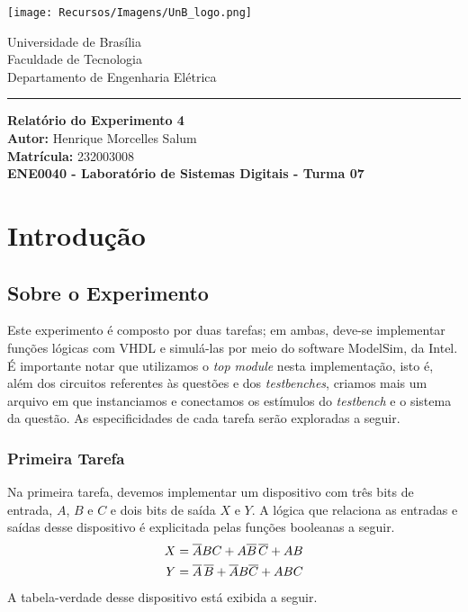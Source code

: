 \documentclass[a4paper,12pt]{article}
\newcommand{\capa}{
    \begin{titlepage}
        \begin{multicols}{2}
            \begin{flushleft}
                \texttt{[image: Recursos/Imagens/UnB\_logo.png]}
            \end{flushleft}
            \columnbreak
            \begin{flushright}
                Universidade de Brasília \\
                Faculdade de Tecnologia \\
                Departamento de Engenharia Elétrica
            \end{flushright}
        \end{multicols}
        \begin{center}
        \vspace{-20pt}
        \rule{\textwidth}{0.4pt}
        \end{center}
        \vspace{0.6cm}
        \begin{center}
            {\Huge \textbf{Relatório do Experimento 4}} \\[1em]
            {\large \textbf{Autor:} Henrique Morcelles Salum} \\[0.5em]
            {\large \textbf{Matrícula:} 232003008} \\
            \vfill
            {\large \textbf{ENE0040 - Laboratório de Sistemas Digitais - Turma 07}} \\
        \end{center}
    \end{titlepage}
}
\begin{document}
\capa

\newpage
\tableofcontents
\newpage

\section{Introdução}

\subsection{Sobre o Experimento}
Este experimento é composto por duas tarefas; em ambas, deve-se implementar funções lógicas com VHDL e simulá-las por meio do software ModelSim, da Intel. É importante notar que utilizamos o \textit{top module} nesta implementação, isto é, além dos circuitos referentes às questões e dos \textit{testbenches}, criamos mais um arquivo em que instanciamos e conectamos os estímulos do \textit{testbench} e o sistema da questão. As especificidades de cada tarefa serão exploradas a seguir.

\subsubsection{Primeira Tarefa}
Na primeira tarefa, devemos implementar um dispositivo com três bits de entrada, $A$, $B$ e $C$ e dois bits de saída $X$ e $Y$. A lógica que relaciona as entradas e saídas desse dispositivo é explicitada pelas funções booleanas a seguir.
\begin{align*}
X=\overline{A}BC + A \overline{B} \hspace{0.05cm} \overline{C} + AB \\
Y= \overline{A} \hspace{0.05cm} \overline{B} + \overline{A} B \overline{C} + ABC
\end{align*}
A tabela-verdade desse dispositivo está exibida a seguir.
\end{document}
